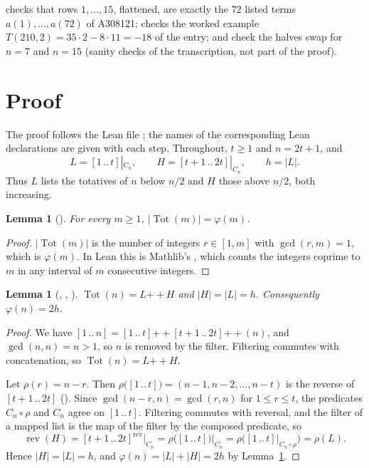 \documentclass[11pt]{amsart}
\theoremstyle{plain}
\newtheorem{lemma}[theorem]{Lemma}
\theoremstyle{definition}
\newcommand{\Tot}{\operatorname{Tot}}
\newcommand{\cat}{\mathbin{+\!\!+}}
\newcommand{\iv}[2]{[#1\,..\,#2]}
\begin{document}
 checks that rows $1,\dots,15$, flattened, are exactly the $72$ listed terms $a(1),\dots,a(72)$ of A308121;  checks the worked example $T(210,2)=35\cdot2-8\cdot11=-18$ of the entry;  and  check the halves swap for $n=7$ and $n=15$ (sanity checks of the transcription, not part of the proof).

\section{Proof}\label{sec:proof}

The proof follows the Lean file ; the names of the corresponding Lean declarations are given with each step.
Throughout, $t\ge1$ and $n=2t+1$, and
\[
  L=\iv{1}{t}|_{C_n},\qquad H=\iv{t+1}{2t}|_{C_n},\qquad h=|L|.
\]
Thus $L$ lists the totatives of $n$ below $n/2$ and $H$ those above $n/2$, both increasing.

\begin{lemma}[]\label{lem:len}
For every $m\ge1$, $|\Tot(m)|=\varphi(m)$.
\end{lemma}

\begin{proof}
$|\Tot(m)|$ is the number of integers $r\in[1,m]$ with $\gcd(r,m)=1$, which is $\varphi(m)$. In Lean this is Mathlib's , which counts the integers coprime to $m$ in any interval of $m$ consecutive integers.
\end{proof}

\begin{lemma}[, , ]\label{lem:tot}
$\Tot(n)=L\cat H$ and $|H|=|L|=h$. Consequently $\varphi(n)=2h$.
\end{lemma}

\begin{proof}
We have $\iv{1}{n}=\iv{1}{t}\cat\iv{t+1}{2t}\cat(n)$, and $\gcd(n,n)=n>1$, so $n$ is removed by the filter. Filtering commutes with concatenation, so $\Tot(n)=L\cat H$.

Let $\rho(r)=n-r$. Then $\rho\bigl(\iv{1}{t}\bigr)=(n-1,n-2,\dots,n-t)$ is the reverse of $\iv{t+1}{2t}$ (). Since $\gcd(n-r,n)=\gcd(r,n)$ for $1\le r\le t$, the predicates $C_n\circ\rho$ and $C_n$ agree on $\iv{1}{t}$. Filtering commutes with reversal, and the filter of a mapped list is the map of the filter by the composed predicate, so
\[
  \operatorname{rev}(H)=\iv{t+1}{2t}^{\mathrm{rev}}\big|_{C_n}=\rho\bigl(\iv{1}{t}\bigr)\big|_{C_n}=\rho\bigl(\iv{1}{t}|_{C_n\circ\rho}\bigr)=\rho(L).
\]
Hence $|H|=|L|=h$, and $\varphi(n)=|L|+|H|=2h$ by Lemma~\ref{lem:len}.
\end{proof}
\end{document}
